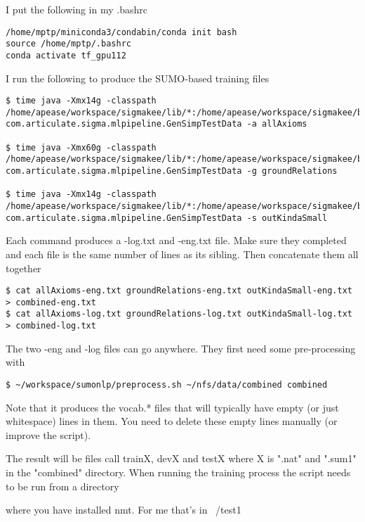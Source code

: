 \documentclass[letterpaper]{article}
\begin{document}
I put the following in my .bashrc

\begin{verbatim}
/home/mptp/miniconda3/condabin/conda init bash
source /home/mptp/.bashrc
conda activate tf_gpu112
\end{verbatim}

I run the following to produce the SUMO-based training files

\begin{verbatim}
$ time java -Xmx14g -classpath /home/apease/workspace/sigmakee/lib/*:/home/apease/workspace/sigmakee/build/classes com.articulate.sigma.mlpipeline.GenSimpTestData -a allAxioms

$ time java -Xmx60g -classpath /home/apease/workspace/sigmakee/lib/*:/home/apease/workspace/sigmakee/build/classes com.articulate.sigma.mlpipeline.GenSimpTestData -g groundRelations

$ time java -Xmx14g -classpath /home/apease/workspace/sigmakee/lib/*:/home/apease/workspace/sigmakee/build/classes com.articulate.sigma.mlpipeline.GenSimpTestData -s outKindaSmall
\end{verbatim}

Each command produces a -log.txt and -eng.txt file. Make sure they completed and each file is the same number of lines as its sibling. Then concatenate them all together

\begin{verbatim}
$ cat allAxioms-eng.txt groundRelations-eng.txt outKindaSmall-eng.txt > combined-eng.txt
$ cat allAxioms-log.txt groundRelations-log.txt outKindaSmall-log.txt > combined-log.txt
\end{verbatim}

The two -eng and -log files can go anywhere. They first need some pre-processing with

\begin{verbatim}
$ ~/workspace/sumonlp/preprocess.sh ~/nfs/data/combined combined
\end{verbatim}

Note that it produces the vocab.* files that will typically have empty (or just whitespace) lines in them. You need to delete these empty lines manually (or improve the script).

The result will be files call trainX, devX and testX where X is ".nat" and ".sum1" in the "combined" directory. When running the training process the script needs to be run from a directory

where you have installed nmt. For me that's in ~/test1
\end{document}
